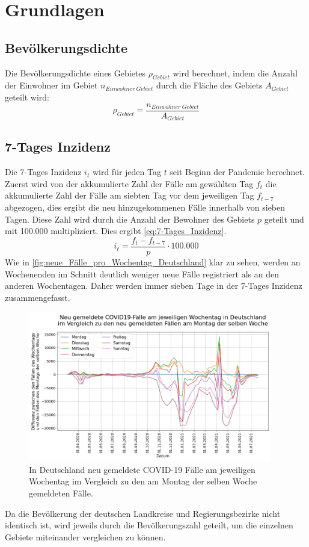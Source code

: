 \chapter{Grundlagen}\label{chap:Grundlagen}
\section{Bevölkerungsdichte}
Die Bevölkerungsdichte eines Gebietes $\rho_{Gebiet}$ wird berechnet, indem die Anzahl der Einwohner im Gebiet $n_{Einwohner\ Gebiet}$ durch die Fläche des Gebiets $A_{Gebiet}$ geteilt wird:
\begin{equation}\label{eq:Bevölkerungsdichte}
    \rho_{Gebiet} = \frac{n_{Einwohner\  Gebiet}}{A_{Gebiet}}
\end{equation}
\section{7-Tages Inzidenz}\label{sec:Datenaufbereitung}
Die 7-Tages Inzidenz $i_t$ wird für jeden Tag $t$ seit Beginn der Pandemie berechnet.
Zuerst wird von der akkumulierte Zahl der Fälle am gewählten Tag $f_t$ die akkumulierte Zahl der Fälle am siebten Tag vor dem jeweiligen Tag $f_{t-7}$ abgezogen, dies ergibt die neu hinzugekommenen Fälle innerhalb von sieben Tagen.
Diese Zahl wird durch die Anzahl der Bewohner des Gebiets $p$ geteilt und mit 100.000 multipliziert. Dies ergibt \autoref{eq:7-Tages_Inzidenz}.
\begin{equation}\label{eq:7-Tages_Inzidenz}
    i_t= \frac{f_t-f_{t-7}}{p}\cdot 100.000
\end{equation}
Wie in \autoref{fig:neue_Fälle_pro_Wochentag_Deutschland} klar zu sehen, werden an Wochenenden im Schnitt deutlich weniger neue Fälle registriert als an den anderen Wochentagen.
Daher werden immer sieben Tage in der 7-Tages Inzidenz zusammengefasst.
\begin{figure}[H]
    \centering
    \includegraphics[width=0.95\textwidth]{figures/neue_Fälle_pro_Wochentag_Deutschland.png}
    \caption{In Deutschland neu gemeldete COVID-19 Fälle am jeweiligen Wochentag im Vergleich zu den am Montag der selben Woche gemeldeten Fälle.}
    \label{fig:neue_Fälle_pro_Wochentag_Deutschland}
\end{figure}
Da die Bevölkerung der deutschen Landkreise und Regierungsbezirke nicht identisch ist, wird jeweils durch die Bevölkerungszahl geteilt, um die einzelnen Gebiete miteinander vergleichen zu können.

